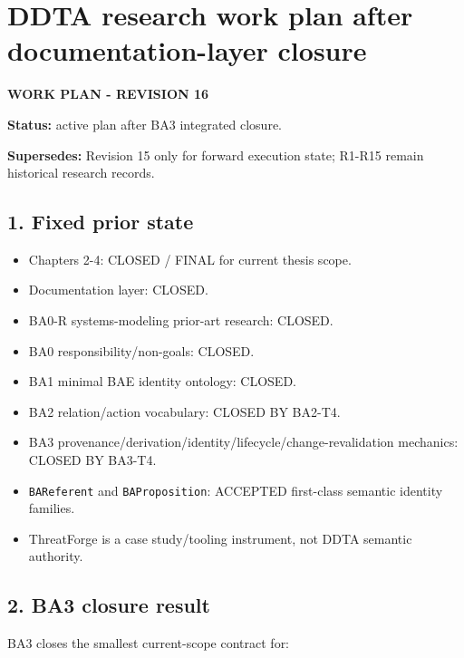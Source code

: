 \documentclass[11pt,a4paper]{article}
\providecommand{\tightlist}{\setlength{\itemsep}{0pt}\setlength{\parskip}{0pt}}
\begin{document}
\section{DDTA research work plan after documentation-layer closure}\label{ddta-research-work-plan-after-documentation-layer-closure}

\textbf{WORK PLAN - REVISION 16}

\textbf{Status:} active plan after BA3 integrated closure.

\textbf{Supersedes:} Revision 15 only for forward execution state; R1-R15 remain historical research records.

\subsection{1. Fixed prior state}\label{fixed-prior-state}

\begin{itemize}
\tightlist
\item
  Chapters 2-4: CLOSED / FINAL for current thesis scope.
\item
  Documentation layer: CLOSED.
\item
  BA0-R systems-modeling prior-art research: CLOSED.
\item
  BA0 responsibility/non-goals: CLOSED.
\item
  BA1 minimal BAE identity ontology: CLOSED.
\item
  BA2 relation/action vocabulary: CLOSED BY BA2-T4.
\item
  BA3 provenance/derivation/identity/lifecycle/change-revalidation mechanics: CLOSED BY BA3-T4.
\item
  \texttt{BAReferent} and \texttt{BAProposition}: ACCEPTED first-class semantic identity families.
\item
  ThreatForge is a case study/tooling instrument, not DDTA semantic authority.
\end{itemize}

\subsection{2. BA3 closure result}\label{ba3-closure-result}

BA3 closes the smallest current-scope contract for:
\end{document}
